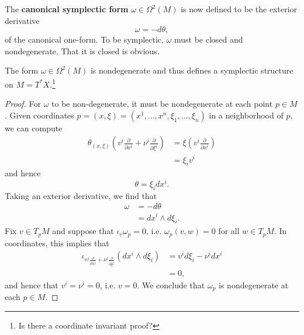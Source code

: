 \documentclass{amsart}
\begin{document}
\begin{definition}
    The \textbf{canonical symplectic form} $\omega\in\Omega^2(M)$ is now defined to be the exterior
    derivative
    \begin{equation*}
        \omega = - d\theta,
    \end{equation*}
    of the canonical one-form. To be symplectic, $\omega$ must be closed and nondegenerate. That it
    is closed is obvious.
\end{definition}

\begin{proposition}
    The form $\omega\in\Omega^2(M)$ is nondegenerate and thus defines a symplectic structure on
    $M=T^*X$.\footnote{Is there a coordinate invariant proof?}
\end{proposition}
\begin{proof}
    For $\omega$ to be non-degenerate, it must be nondegenerate at each point $p\in M$. Given
    coordinates $p=(x,\xi)=(x^1,\ldots,x^n,\xi_1,\ldots,\xi_n)$ in a neighborhood of $p$, we can
    compute
    \begin{align*}
        \theta_{(x,\xi)}\left( v^i\frac{\partial}{\partial x^i} + \nu^i\frac{\partial}{\partial\xi^i} \right)
        &= \xi\left( v^i\frac{\partial}{\partial x^i} \right) \\
        &= \xi_iv^i
    \end{align*}
    and hence
    \begin{equation*}
        \theta = \xi_i dx^i.
    \end{equation*}
    Taking an exterior derivative, we find that
    \begin{align*}
        \omega &= - d\theta \\
        &= dx^i\wedge d\xi_i.
    \end{align*}
    Fix $v\in T_pM$ and suppose that $\iota_v\omega_p=0$, i.e. $\omega_p(v,w)=0$
    for all $w\in T_pM$. In coordinates, this implies that
    \begin{align*}
        \iota_{v^j\frac{\partial}{\partial x^j}+\nu^j\frac{\partial}{\partial\xi^j}}(dx^i\wedge d\xi_i)
        &= v^id\xi_i-\nu^idx^i\\
        &=0,
    \end{align*}
    and hence that $v^i=\nu^i=0$, i.e. $v=0$. We conclude that $\omega_p$ is nondegenerate at each $p\in M$.
\end{proof}
\end{document}
